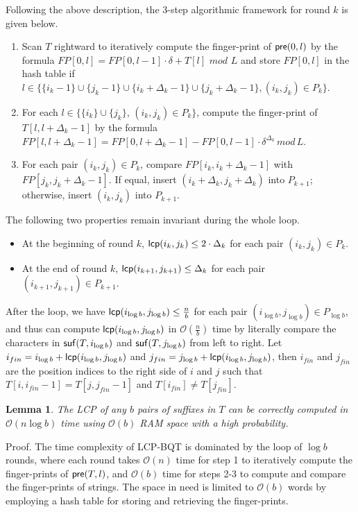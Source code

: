 \documentclass{llncs}
\newtheorem{lem}{Lemma}
\begin{document}
Following the above description, the 3-step algorithmic framework for round $k$ is given below.

\begin{enumerate}[S1.]
\item Scan $T$ rightward to iteratively compute the finger-print of ${\sf pre}(0,l)$ by the formula $FP[0,l] = FP[0,l-1] \cdot \delta + T[l] \,\, mod \,\, L$ and store $FP[0,l]$ in the hash table if $l\in \{ \{i_k-1\}\cup\{j_k-1\}\cup\{i_k +\Delta_{k} - 1\}\cup\{j_k+ \Delta_{k} - 1\},(i_k,j_k)\in P_k\}$.
\item For each $l\in \{\{i_k\}\cup \{j_k\}$, $(i_k,j_k)\in P_k\}$, compute the finger-print of $T[l,l+\Delta_{k} - 1]$ by the formula $FP[l,l+ \Delta_{k} - 1]=FP[0,l+ \Delta_{k} - 1] - FP[0,l-1] \cdot \delta^{\Delta_{k}} \, mod \, L$.
\item For each pair $(i_k,j_k)\in P_k$, compare $FP[i_k,i_k+\Delta_{k} - 1]$ with $FP[j_k,j_k+\Delta_{k} - 1]$. If equal, insert $(i_k+\Delta_{k},j_k+\Delta_{k})$ into $P_{k+1}$; otherwise, insert $(i_k, j_k)$ into $P_{k+1}$.
\end{enumerate}

The following two properties remain invariant during the whole loop.

\begin{itemize}
\item At the beginning of round $k$, ${\sf lcp}(i_k,j_k) \le 2 \cdot \Delta_{k}$ for each pair $(i_k,j_k) \in P_k$.
\item At the end of round $k$, ${\sf lcp}(i_{k+1},j_{k+1}) \le \Delta_{k}$ for each pair $(i_{k+1},j_{k+1}) \in P_{k+1}$.
\end{itemize}

After the loop, we have ${\sf lcp}(i_{\log b},j_{\log b}) \le \frac{n}{b}$ for each pair $(i_{\log b},j_{\log b}) \in P_{\log b}$, and thus can compute ${\sf lcp}(i_{\log b}, j_{\log b})$ in $\mathcal{O}(\frac{n}{b})$ time by literally compare the characters in ${\sf suf}(T,i_{\log b})$ and ${\sf suf}(T,j_{\log b})$ from left to right. Let $i_{fin} = i_{\log b} + {\sf lcp}(i_{\log b}, j_{\log b})$ and $j_{fin}= j_{\log b} + {\sf lcp}(i_{\log b}, j_{\log b})$, then $i_{fin}$ and $j_{fin}$ are the position indices to the right side of $i$ and $j$ such that $T[i,i_{fin}-1] = T[j,j_{fin}-1]$ and $T[i_{fin}] \neq T[j_{fin}]$.

\begin{lem}
\label{thm:lcp:naive}
The LCP of any $b$ pairs of suffixes in $T$ can be correctly computed in $\mathcal{O}(n\log b)$ time using $\mathcal{O}(b)$ RAM space with a high probability.
\end{lem}
Proof. The time complexity of LCP-BQT is dominated by the loop of $\log b$ rounds, where each round takes $\mathcal{O}(n)$ time for step 1 to iteratively compute the finger-prints of ${\sf pre}(T,l)$, and $\mathcal{O}(b)$ time for steps 2-3 to compute and compare the finger-prints of strings. The space in need is limited to $\mathcal{O}(b)$ words by employing a hash table for storing and retrieving the finger-prints.
\end{document}
